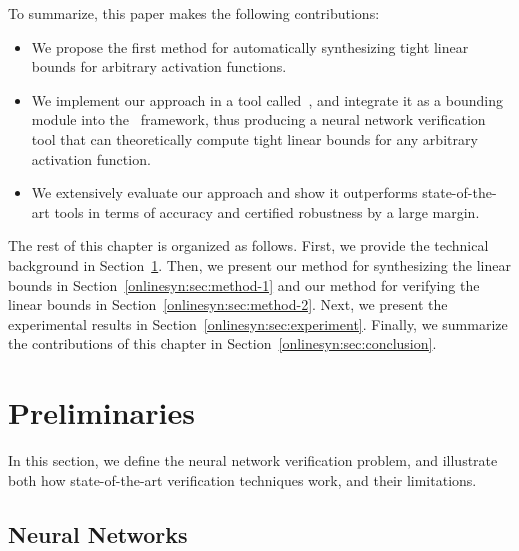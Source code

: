 
To summarize, this paper makes the following contributions:
\begin{itemize}
	\item We propose the first method for automatically synthesizing  tight linear bounds for
	arbitrary activation functions.
	\item We implement our approach in a tool called~\Name{}, and integrate it
	as a bounding module into the~\autolipra{} framework, thus producing a
	neural network verification tool that can theoretically compute tight linear
	bounds for any arbitrary activation function.
	\item We extensively evaluate our approach and show it outperforms
	state-of-the-art tools in terms of accuracy and certified robustness by a
	large margin.
\end{itemize}


The rest of this chapter is organized as follows.  First, we provide the
technical background in Section~\ref{onlinesyn:sec:preliminaries}.  Then, we
present our method for synthesizing the linear bounds in
Section~\ref{onlinesyn:sec:method-1} and our method for verifying the linear
bounds in Section~\ref{onlinesyn:sec:method-2}.  Next, we present the
experimental results in Section~\ref{onlinesyn:sec:experiment}. Finally, we
summarize the contributions of this chapter in
Section~\ref{onlinesyn:sec:conclusion}.



\section{Preliminaries}
\label{onlinesyn:sec:preliminaries}

In this section, we define the neural network verification problem, and
illustrate both how state-of-the-art verification techniques work, and their
limitations.

\subsection{Neural Networks}


